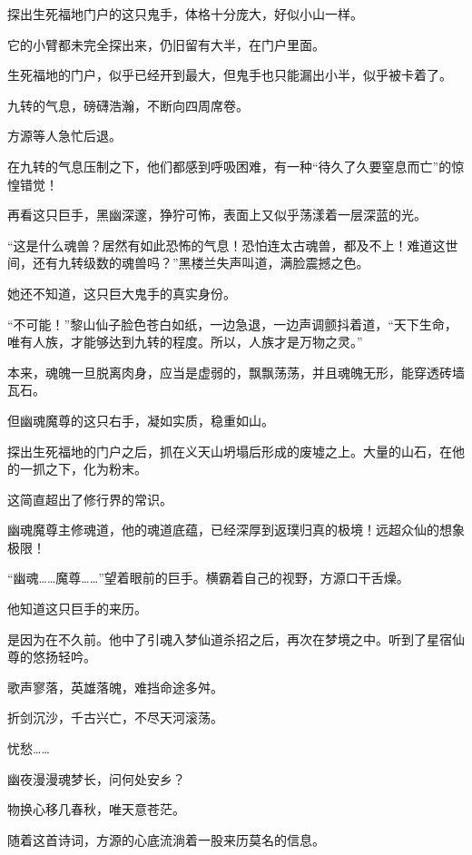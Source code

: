
\begin{this_body}

探出生死福地门户的这只鬼手，体格十分庞大，好似小山一样。

它的小臂都未完全探出来，仍旧留有大半，在门户里面。

生死福地的门户，似乎已经开到最大，但鬼手也只能漏出小半，似乎被卡着了。

九转的气息，磅礴浩瀚，不断向四周席卷。

方源等人急忙后退。

在九转的气息压制之下，他们都感到呼吸困难，有一种“待久了久要窒息而亡”的惊惶错觉！

再看这只巨手，黑幽深邃，狰狞可怖，表面上又似乎荡漾着一层深蓝的光。

“这是什么魂兽？居然有如此恐怖的气息！恐怕连太古魂兽，都及不上！难道这世间，还有九转级数的魂兽吗？”黑楼兰失声叫道，满脸震撼之色。

她还不知道，这只巨大鬼手的真实身份。

“不可能！”黎山仙子脸色苍白如纸，一边急退，一边声调颤抖着道，“天下生命，唯有人族，才能够达到九转的程度。所以，人族才是万物之灵。”

本来，魂魄一旦脱离肉身，应当是虚弱的，飘飘荡荡，并且魂魄无形，能穿透砖墙瓦石。

但幽魂魔尊的这只右手，凝如实质，稳重如山。

探出生死福地的门户之后，抓在义天山坍塌后形成的废墟之上。大量的山石，在他的一抓之下，化为粉末。

这简直超出了修行界的常识。

幽魂魔尊主修魂道，他的魂道底蕴，已经深厚到返璞归真的极境！远超众仙的想象极限！

“幽魂……魔尊……”望着眼前的巨手。横霸着自己的视野，方源口干舌燥。

他知道这只巨手的来历。

是因为在不久前。他中了引魂入梦仙道杀招之后，再次在梦境之中。听到了星宿仙尊的悠扬轻吟。

歌声寥落，英雄落魄，难挡命途多舛。

折剑沉沙，千古兴亡，不尽天河滚荡。

忧愁……

幽夜漫漫魂梦长，问何处安乡？

物换心移几春秋，唯天意苍茫。

随着这首诗词，方源的心底流淌着一股来历莫名的信息。


\end{this_body}
